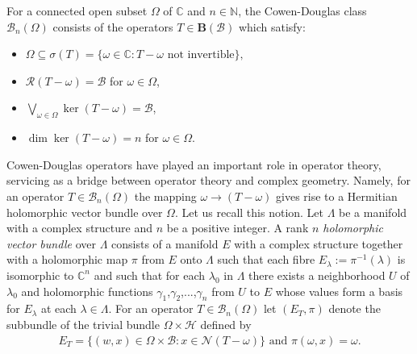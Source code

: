 \documentclass[reqno]{amsproc}
\numberwithin{equation}{section}
\theoremstyle{remark}
\newcommand*{\bscr}{\mathscr{B}}
\newcommand*{\hh}{\mathcal{H}}
\newcommand*{\natu}{\mathbb{N}}
\newcommand*{\nul}{\mathscr{N}}
\newcommand*{\comp}{\mathbb{C}}
\newcommand*{\bou}{\boldsymbol{B}}
\theoremstyle{definition}
\newcommand{\bspace}{\mathcal{B}}
\newcommand*{\ran}{\mathscr{R}}
\begin{document}
For a connected open subset $\varOmega$ of $\comp$ and $n\in \natu$, the Cowen-Douglas class $\bscr_n(\varOmega)$
consists of the operators $T\in\bou(\bspace)$
which satisfy:
\begin{itemize}
    \item[(i)] $\varOmega\subseteq\sigma(T)=\{\omega\in\comp\colon T-\omega \text{ not invertible}\},$
    \item[(ii)] $\ran(T-\omega)=\bspace$ for $\omega\in\varOmega$,
    \item[(iii)] $\bigvee_{\omega\in\varOmega}\ker(T-\omega)=\bspace$,
    \item[(iv)] $\dim \ker (T-\omega)=n$ for $\omega\in\varOmega$.
\end{itemize}
Cowen-Douglas operators have played an important role in operator theory, servicing as a bridge
between operator theory and complex geometry. 
Namely, for an operator $T\in\bscr_n(\varOmega)$ the mapping $\omega\to(T-\omega)$
gives rise to a Hermitian holomorphic vector bundle over $\varOmega$. Let us recall this notion. Let $\Lambda$ be a manifold with a complex structure and $n$ be a
positive integer. A rank \textit{$n$ holomorphic vector bundle} over $\Lambda$ consists of a manifold $E$ with
a complex structure together
with a holomorphic map $\pi$ from $E$ onto $\Lambda$ such that each
fibre $E_\lambda:=\pi^{-1}(\lambda)$  is isomorphic to $\comp^n$ and such that for each $\lambda_0$ in $\Lambda$ there exists a neighborhood $U$ of $\lambda_0$ and holomorphic functions $\gamma_1$,$\gamma_2$,...,$\gamma_n$ from $U$ to $E$ whose values form
a basis for $E_\lambda$ at each $\lambda\in\Lambda$. For an operator $T\in\bscr_n(\varOmega)$ let $(E_T,\pi)$ denote the subbundle of the trivial bundle $\varOmega\times\hh$ defined by
\begin{align*}
E_T=\{(w,x)\in\varOmega\times\bspace\colon x\in \nul(T-\omega)\} \text{ and } \pi(\omega,x)=\omega.
\end{align*}
\end{document}
